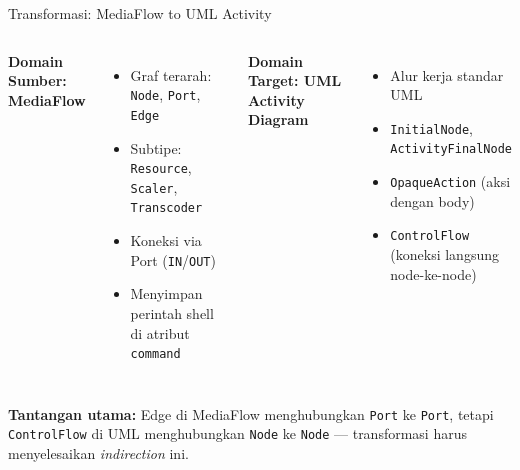 \documentclass[aspectratio=169, table]{beamer}
\begin{document}
\begin{frame}{Transformasi: MediaFlow to UML Activity}
\vspace{6pt}
\begin{columns}[T]
\textbf{Domain Sumber: MediaFlow}
\begin{itemize}
  \item Graf terarah: \texttt{Node}, \texttt{Port}, \texttt{Edge}
  \item Subtipe: \texttt{Resource}, \texttt{Scaler}, \texttt{Transcoder}
  \item Koneksi via Port (\texttt{IN}/\texttt{OUT})
  \item Menyimpan perintah shell di atribut \texttt{command}
\end{itemize}

\textbf{Domain Target: UML Activity Diagram}
\begin{itemize}
  \item Alur kerja standar UML
  \item \texttt{InitialNode}, \texttt{ActivityFinalNode}
  \item \texttt{OpaqueAction} (aksi dengan body)
  \item \texttt{ControlFlow} (koneksi langsung node-ke-node)
\end{itemize}
\end{columns}

\vspace{8pt}
\small
\textbf{Tantangan utama:} Edge di MediaFlow menghubungkan \texttt{Port} ke \texttt{Port}, tetapi \texttt{ControlFlow} di UML menghubungkan \texttt{Node} ke \texttt{Node} --- transformasi harus menyelesaikan \textit{indirection} ini.
\end{frame}
\end{document}

